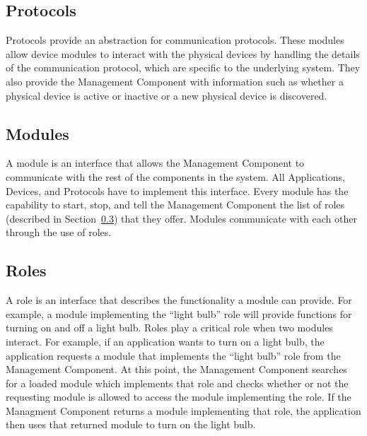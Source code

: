 \subsection{Protocols}
\label{sec:protocols}
Protocols provide an abstraction for communication protocols. These modules
allow device modules to interact with the physical devices by handling the
details of the communication protocol, which are specific to the underlying
system. They also provide the Management Component with information such as
whether a physical device is active or inactive or a new physical device is
discovered.
\subsection{Modules}
\label{sec:mods}
A module is an interface that allows the Management Component to communicate
with the rest of the components in the system. All Applications, Devices, and
Protocols have to implement this interface. Every module has the capability to
start, stop, and tell the Management Component the list of roles (described in 
Section~\ref{sec:roles}) that they offer. Modules communicate with each
other through the use of roles.
\subsection{Roles}
\label{sec:roles}
A role is an interface that describes the functionality a module can provide. 
For example, a module implementing the ``light bulb'' role will provide functions
for turning on and off a light bulb. Roles play a critical role when two
modules interact. For example, if an application wants to turn on a light bulb,
the application requests a module that implements the ``light bulb'' role from 
the Management Component. At this point, the Management Component searches for a
loaded module which implements that role and checks whether or not the
requesting module is allowed to access the module implementing the role. If the
Managment Component returns a module implementing that role, the application
then uses that returned module to turn on the light bulb.
